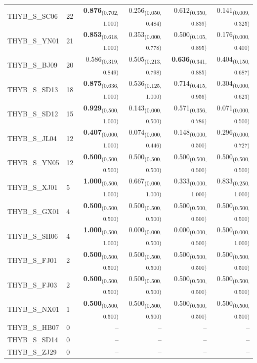 \begin{table}[p]
\begin{tabular}{llrrrr}
THYB\_S\_SC06 & 22 & \textbf{0.876}\textsubscript{(0.702, 1.000)} & 0.256\textsubscript{(0.050, 0.484)} & 0.612\textsubscript{(0.350, 0.839)} & 0.141\textsubscript{(0.009, 0.325)} \\
THYB\_S\_YN01 & 21 & \textbf{0.853}\textsubscript{(0.618, 1.000)} & 0.353\textsubscript{(0.000, 0.778)} & 0.500\textsubscript{(0.105, 0.895)} & 0.176\textsubscript{(0.000, 0.400)} \\
THYB\_S\_BJ09 & 20 & 0.586\textsubscript{(0.319, 0.849)} & 0.505\textsubscript{(0.213, 0.798)} & \textbf{0.636}\textsubscript{(0.341, 0.885)} & 0.404\textsubscript{(0.150, 0.687)} \\
THYB\_S\_SD13 & 18 & \textbf{0.875}\textsubscript{(0.636, 1.000)} & 0.536\textsubscript{(0.125, 1.000)} & 0.714\textsubscript{(0.415, 0.956)} & 0.304\textsubscript{(0.000, 0.623)} \\
THYB\_S\_SD12 & 15 & \textbf{0.929}\textsubscript{(0.500, 1.000)} & 0.143\textsubscript{(0.000, 0.500)} & 0.571\textsubscript{(0.356, 0.786)} & 0.071\textsubscript{(0.000, 0.500)} \\
THYB\_S\_JL04 & 12 & \textbf{0.407}\textsubscript{(0.000, 1.000)} & 0.074\textsubscript{(0.000, 0.446)} & 0.148\textsubscript{(0.000, 0.500)} & 0.296\textsubscript{(0.000, 0.727)} \\
THYB\_S\_YN05 & 12 & \textbf{0.500}\textsubscript{(0.500, 0.500)} & 0.500\textsubscript{(0.500, 0.500)} & 0.500\textsubscript{(0.500, 0.500)} & 0.500\textsubscript{(0.500, 0.500)} \\
THYB\_S\_XJ01 & 5 & \textbf{1.000}\textsubscript{(0.500, 1.000)} & 0.667\textsubscript{(0.000, 1.000)} & 0.333\textsubscript{(0.000, 1.000)} & 0.833\textsubscript{(0.250, 1.000)} \\
THYB\_S\_GX01 & 4 & \textbf{0.500}\textsubscript{(0.500, 0.500)} & 0.500\textsubscript{(0.500, 0.500)} & 0.500\textsubscript{(0.500, 0.500)} & 0.500\textsubscript{(0.500, 0.500)} \\
THYB\_S\_SH06 & 4 & \textbf{1.000}\textsubscript{(0.500, 1.000)} & 0.000\textsubscript{(0.000, 0.500)} & 0.000\textsubscript{(0.000, 0.500)} & 0.500\textsubscript{(0.000, 1.000)} \\
THYB\_S\_FJ01 & 2 & \textbf{0.500}\textsubscript{(0.500, 0.500)} & 0.500\textsubscript{(0.500, 0.500)} & 0.500\textsubscript{(0.500, 0.500)} & 0.500\textsubscript{(0.500, 0.500)} \\
THYB\_S\_FJ03 & 2 & \textbf{0.500}\textsubscript{(0.500, 0.500)} & 0.500\textsubscript{(0.500, 0.500)} & 0.500\textsubscript{(0.500, 0.500)} & 0.500\textsubscript{(0.500, 0.500)} \\
THYB\_S\_NX01 & 1 & \textbf{0.500}\textsubscript{(0.500, 0.500)} & 0.500\textsubscript{(0.500, 0.500)} & 0.500\textsubscript{(0.500, 0.500)} & 0.500\textsubscript{(0.500, 0.500)} \\
THYB\_S\_HB07 & 0 & -- & -- & -- & -- \\
THYB\_S\_SD14 & 0 & -- & -- & -- & -- \\
THYB\_S\_ZJ29 & 0 & -- & -- & -- & -- \\
\bottomrule
\end{tabular}
\end{table}
\clearpage
